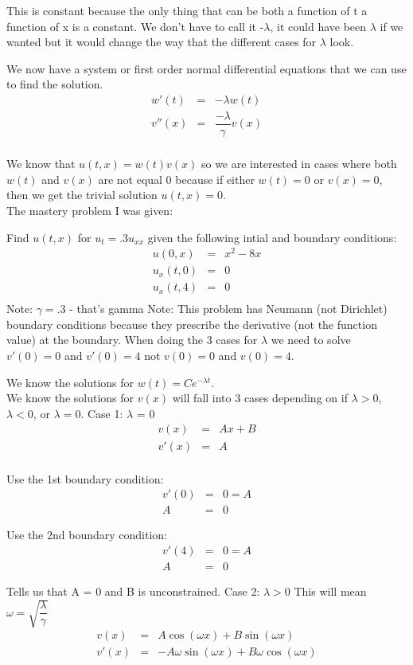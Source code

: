 \documentclass{article}
\newcommand{\bea}{\begin{eqnarray*}}
\newcommand{\eea}{\end{eqnarray*}}
\begin{document}
This is constant because the only thing that can be both a function of t a function of x is a constant. We don't have to call it -$\lambda$, it could have been $\lambda$ if we wanted but it would change the way that the different cases for $\lambda$ look. \newline

We now have a system or first order normal differential equations that we can use to find the solution.
\bea
w'(t) &=& -\lambda w(t) \\
v''(x) &=& \dfrac{-\lambda}{\gamma}v(x) \\
\eea

We know that $u(t,x) = w(t)v(x)$ so we are interested in cases where both $w(t)$ and $v(x)$ are not equal 0 because if either $w(t)=0$ or $v(x)=0$, then we get the trivial solution $u(t,x) = 0$.\\

The mastery problem I was given: \newline

Find $u(t,x)$ for $u_t=.3u_{xx}$ given the following intial and boundary conditions:
\bea
u(0,x)&=&x^2-8x\\
u_x(t,0)&=&0\\
u_x(t,4)&=&0\\
\eea
Note: $\gamma=.3$ - that's gamma \newline
Note: This problem has Neumann (not Dirichlet) boundary conditions because they prescribe the derivative (not the function value) at the boundary. When doing the 3 cases for $\lambda$ we need to solve $v'(0)=0$ and $v'(0)=4$ not $v(0)=0$ and $v(0)=4$.\newline

We know the solutions for $w(t)=Ce^{-\lambda t}$. \\

We know the solutions for $v(x)$ will fall into 3 cases depending on if $\lambda > 0$, $\lambda < 0$, or $\lambda = 0$. \newline
Case 1: $\lambda$ = 0 
\bea
v(x) &=& Ax+B\\
v'(x) &=& A\\
\eea

Use the 1st boundary condition:
\bea
v'(0) &=& 0 = A\\
A &=& 0
\eea

Use the 2nd boundary condition:
\bea
v'(4) &=& 0 = A\\
A &=& 0
\eea

Tells us that A = 0 and B is unconstrained.\newline
Case 2: $\lambda > 0$ This will mean $\omega=\sqrt{\dfrac{\lambda}{\gamma}}$
\bea
v(x) &=& A\cos(\omega x)+B\sin(\omega x) \\
v'(x) &=& -A\omega \sin(\omega x)+B\omega \cos(\omega x)  \\
\eea
\end{document}
